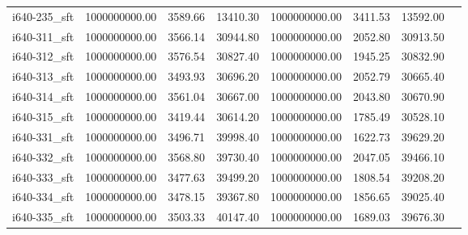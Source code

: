 \begin{tabular}{llrrrrrr}
i640-235\_sft &      1000000000.00 &                3589.66 &         13410.30 &    1000000000.00 &              3411.53 &       13592.00 \\
i640-311\_sft &      1000000000.00 &                3566.14 &         30944.80 &    1000000000.00 &              2052.80 &       30913.50 \\
i640-312\_sft &      1000000000.00 &                3576.54 &         30827.40 &    1000000000.00 &              1945.25 &       30832.90 \\
i640-313\_sft &      1000000000.00 &                3493.93 &         30696.20 &    1000000000.00 &              2052.79 &       30665.40 \\
i640-314\_sft &      1000000000.00 &                3561.04 &         30667.00 &    1000000000.00 &              2043.80 &       30670.90 \\
i640-315\_sft &      1000000000.00 &                3419.44 &         30614.20 &    1000000000.00 &              1785.49 &       30528.10 \\
i640-331\_sft &      1000000000.00 &                3496.71 &         39998.40 &    1000000000.00 &              1622.73 &       39629.20 \\
i640-332\_sft &      1000000000.00 &                3568.80 &         39730.40 &    1000000000.00 &              2047.05 &       39466.10 \\
i640-333\_sft &      1000000000.00 &                3477.63 &         39499.20 &    1000000000.00 &              1808.54 &       39208.20 \\
i640-334\_sft &      1000000000.00 &                3478.15 &         39367.80 &    1000000000.00 &              1856.65 &       39025.40 \\
i640-335\_sft &      1000000000.00 &                3503.33 &         40147.40 &    1000000000.00 &              1689.03 &       39676.30 \\
\bottomrule
\end{tabular}
